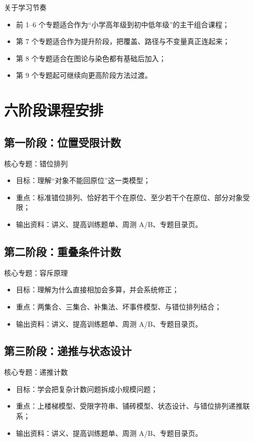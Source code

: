 \documentclass[11pt,a4paper,fontset=fandol]{ctexart}
\begin{document}
\begin{warnbox}{关于学习节奏}
\begin{itemize}
  \item 前 1--6 个专题适合作为“小学高年级到初中低年级”的主干组合课程；
  \item 第 7 个专题适合作为提升阶段，把覆盖、路径与不变量真正连起来；
  \item 第 8 个专题适合在图论与染色都有基础后加入；
  \item 第 9 个专题起可继续向更高阶段方法过渡。
\end{itemize}
\end{warnbox}

\section{六阶段课程安排}

\subsection{第一阶段：位置受限计数}
核心专题：错位排列
\begin{itemize}
  \item 目标：理解“对象不能回原位”这一类模型；
  \item 重点：标准错位排列、恰好若干个在原位、至少若干个在原位、部分对象受限；
  \item 输出资料：讲义、提高训练题单、周测 A/B、专题目录页。
\end{itemize}

\subsection{第二阶段：重叠条件计数}
核心专题：容斥原理
\begin{itemize}
  \item 目标：理解为什么直接相加会多算，并会系统修正；
  \item 重点：两集合、三集合、补集法、坏事件模型、与错位排列结合；
  \item 输出资料：讲义、提高训练题单、周测 A/B、专题目录页。
\end{itemize}

\subsection{第三阶段：递推与状态设计}
核心专题：递推计数
\begin{itemize}
  \item 目标：学会把复杂计数问题拆成小规模问题；
  \item 重点：上楼梯模型、受限字符串、铺砖模型、状态设计、与错位排列递推联系；
  \item 输出资料：讲义、提高训练题单、周测 A/B、专题目录页。
\end{itemize}
\end{document}
